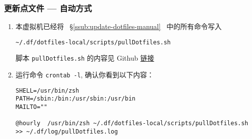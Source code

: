 \documentclass[
    11pt,
    cite=authoryear,
    device=normal,
    lang=cn,
    mode=simple,
    result=answer,
    toc=onecol,
]{elegantbook_sierxue}
\begin{document}
\subsubsection{更新点文件 --- 自动方式}%
\label{ssub:update-dotfiles-crontab}

\begin{enumerate}
    \item 本虚拟机已经将 ~\S\ref{ssub:update-dotfiles-manual}~ 中的所有命令写入
\begin{lstlisting}[escapeinside=``]
~/.df/dotfiles-local/scripts/pullDotfiles.sh
\end{lstlisting}
        脚本 \lstinline{pullDotfiles.sh} 的内容见 Github
        \href{https://github.com/ddpom/scripts/blob/master/pullDotfiles.sh}
        {链接}
    \item 运行命令 \lstinline{crontab -l}, 确认你看到以下内容：
\begin{lstlisting}[escapeinside=``]
SHELL=/usr/bin/zsh
PATH=/sbin:/bin:/usr/sbin:/usr/bin
MAILTO=""

@hourly  /usr/bin/zsh ~/.df/dotfiles-local/scripts/pullDotfiles.sh >> ~/.df/log/pullDotfiles.log
\end{lstlisting}
\end{enumerate}

%
\end{document}
